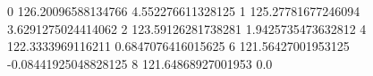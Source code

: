 0 126.20096588134766 4.552276611328125
1 125.27781677246094 3.6291275024414062
2 123.59126281738281 1.9425735473632812
4 122.3333969116211 0.6847076416015625
6 121.56427001953125 -0.08441925048828125
8 121.64868927001953 0.0
